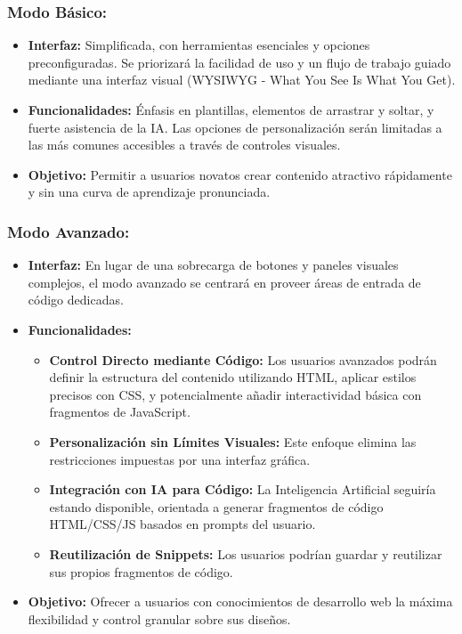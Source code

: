 \documentclass[12pt,a4paper]{report}
\begin{document}
\subsubsection{Modo Básico:}

\begin{itemize}
\item \textbf{Interfaz:} Simplificada, con herramientas esenciales y opciones preconfiguradas. Se priorizará la facilidad de uso y un flujo de trabajo guiado mediante una interfaz visual (WYSIWYG - What You See Is What You Get).

\item \textbf{Funcionalidades:} Énfasis en plantillas, elementos de arrastrar y soltar, y fuerte asistencia de la IA. Las opciones de personalización serán limitadas a las más comunes accesibles a través de controles visuales.

\item \textbf{Objetivo:} Permitir a usuarios novatos crear contenido atractivo rápidamente y sin una curva de aprendizaje pronunciada.
\end{itemize}

\subsubsection{Modo Avanzado:}

\begin{itemize}
\item \textbf{Interfaz:} En lugar de una sobrecarga de botones y paneles visuales complejos, el modo avanzado se centrará en proveer áreas de entrada de código dedicadas.

\item \textbf{Funcionalidades:}
\begin{itemize}
\item \textbf{Control Directo mediante Código:} Los usuarios avanzados podrán definir la estructura del contenido utilizando HTML, aplicar estilos precisos con CSS, y potencialmente añadir interactividad básica con fragmentos de JavaScript.

\item \textbf{Personalización sin Límites Visuales:} Este enfoque elimina las restricciones impuestas por una interfaz gráfica.

\item \textbf{Integración con IA para Código:} La Inteligencia Artificial seguiría estando disponible, orientada a generar fragmentos de código HTML/CSS/JS basados en prompts del usuario.

\item \textbf{Reutilización de Snippets:} Los usuarios podrían guardar y reutilizar sus propios fragmentos de código.
\end{itemize}

\item \textbf{Objetivo:} Ofrecer a usuarios con conocimientos de desarrollo web la máxima flexibilidad y control granular sobre sus diseños.
\end{itemize}
\end{document}
